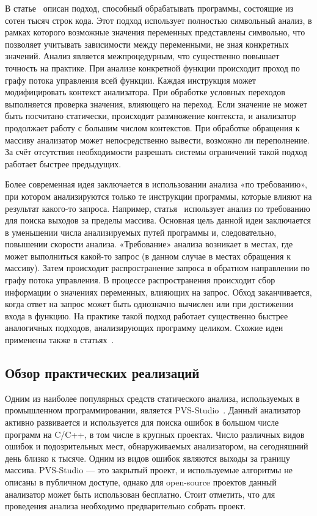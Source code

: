 В статье~\cite{xie2003archer} описан подход, способный обрабатывать
программы, состоящие из сотен тысяч строк кода. Этот подход использует
полностью символьный анализ, в рамках которого возможные значения
переменных представлены символьно, что позволяет учитывать зависимости
между переменными, не зная конкретных значений. Анализ является
межпроцедурным, что существенно повышает точность на практике. При
анализе конкретной функции происходит проход по графу потока
управления всей функции. Каждая инструкция может модифицировать
контекст анализатора. При обработке условных переходов выполняется
проверка значения, влияющего на переход. Если значение не может быть
посчитано статически, происходит размножение контекста, и анализатор
продолжает работу с большим числом контекстов. При обработке обращения
к массиву анализатор может непосредственно вывести, возможно ли
переполнение. За счёт отсутствия необходимости разрешать системы
ограничений такой подход работает быстрее предыдущих.

Более современная идея заключается в использовании анализа «по
требованию», при котором анализируются только те инструкции программы,
которые влияют на результат какого-то запроса. Например,
статья~\cite{le2008marple} использует анализ по требованию для поиска
выходов за пределы массива. Основная цель данной идеи заключается в
уменьшении числа анализируемых путей программы и, следовательно,
повышении скорости анализа. «Требование» анализа возникает в местах,
где может выполниться какой-то запрос (в данном случае в местах
обращения к массиву). Затем происходит распространение запроса в
обратном направлении по графу потока управления. В процессе
распространения происходит сбор информации о значениях переменных,
влияющих на запрос. Обход заканчивается, когда ответ на запрос может
быть однозначно вычислен или при достижении входа в функцию. На
практике такой подход работает существенно быстрее аналогичных
подходов, анализирующих программу целиком. Схожие идеи применены также
в статьях~\cite{ding2012detection, ding2014abor, li2010practical}.

\subsection{Обзор практических реализаций}

Одним из наиболее популярных средств статического анализа,
используемых в промышленном программировании, является
PVS-Studio~\cite{pvs-studio}. Данный анализатор активно развивается и
используется для поиска ошибок в большом числе программ на C/C++, в
том числе в крупных проектах. Число различных видов ошибок и
подозрительных мест, обнаруживаемых анализатором, на сегодняшний день
близко к тысяче. Одним из видов ошибок являются выходы за границу
массива. PVS-Studio --- это закрытый проект, и используемые алгоритмы
не описаны в публичном доступе, однако для open-source проектов данный
анализатор может быть использован бесплатно. Стоит отметить, что для
проведения анализа необходимо предварительно собрать проект.

